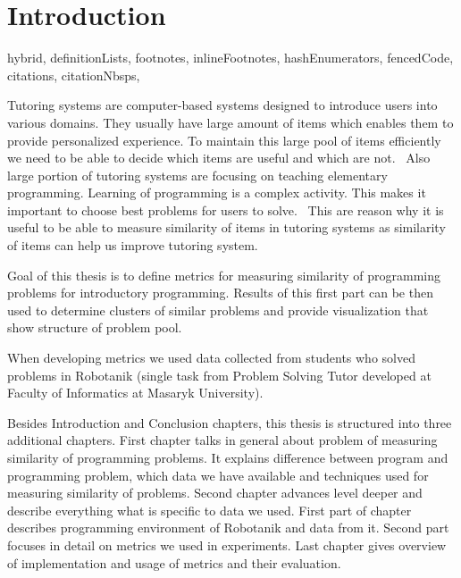 \documentclass[
  digital, %
  table,   %
  nolof,     %
  nolot,     %
  nocover
]{fithesis3}
\begin{document}
\chapter*{Introduction}


\begin{markdown*}{%
  hybrid,
  definitionLists,
  footnotes,
  inlineFootnotes,
  hashEnumerators,
  fencedCode,
  citations,
  citationNbsps,
}

%
%

Tutoring systems are computer-based systems designed to introduce users into various domains.
They usually have large amount of items which enables them to provide personalized experience. To maintain this large pool of items efficiently we need to be able to decide which items are useful and which are not. ~Also large portion of tutoring systems are focusing on teaching elementary programming. Learning of programming is a complex activity. This makes it important to choose best problems for users to solve.~
This are reason why it is useful to be able to measure similarity of items in tutoring systems as similarity of items can help us improve tutoring system.

Goal of this thesis is to define metrics for measuring similarity of programming problems for introductory programming. Results of this first part can be then used to determine clusters of similar problems and provide visualization that show structure of problem pool.

When developing metrics we used data collected from students who solved problems in Robotanik (single task from Problem Solving Tutor developed at Faculty of Informatics at Masaryk University).

Besides Introduction and Conclusion chapters, this thesis is structured into three additional chapters. First chapter talks in general about problem of measuring similarity of programming problems. It explains difference between program and programming problem, which data we have available and techniques used for measuring similarity of problems. Second chapter advances level deeper and describe everything what is specific to data we used. First part of chapter describes programming environment of Robotanik and data from it. Second part focuses in detail on metrics we used in experiments. Last chapter gives overview of implementation and usage of metrics and their evaluation.


%
%


\end{markdown*}
\end{document}
